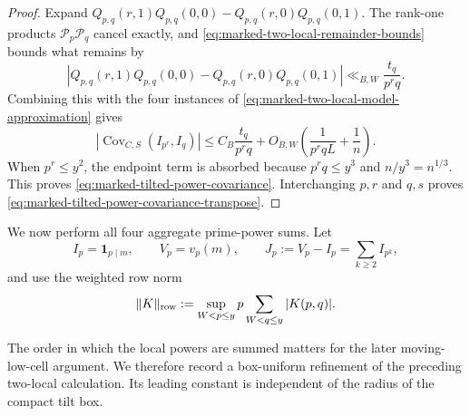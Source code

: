 \documentclass[11pt]{article}
\numberwithin{equation}{section}
\theoremstyle{definition}
\theoremstyle{remark}
\newcommand{\1}{\mathbf 1}
\begin{document}
\begin{proof}
Expand
\(
 Q_{p,q}(r,1)Q_{p,q}(0,0)
 -Q_{p,q}(r,0)Q_{p,q}(0,1)
\).
The rank-one products \(\mathcal P_p\mathcal P_q\) cancel exactly, and
\eqref{eq:marked-two-local-remainder-bounds} bounds what remains by
\begin{equation}
 \left|Q_{p,q}(r,1)Q_{p,q}(0,0)
 -Q_{p,q}(r,0)Q_{p,q}(0,1)\right|
 \ll_{B,W}\frac{t_q}{p^rq}.
 \label{eq:marked-two-local-model-covariance}
\end{equation}
Combining this with the four instances of
\eqref{eq:marked-two-local-model-approximation} gives
\[
 |\operatorname{Cov}_{C,S}(I_{p^r},I_q)|
 \le C_B\frac{t_q}{p^rq}
 +O_{B,W}\!\left(\frac1{p^rqL}+\frac1n\right).
\]
When \(p^r\le y^2\), the endpoint term is absorbed because
\(p^rq\le y^3\) and \(n/y^3=n^{1/3}\).  This proves
\eqref{eq:marked-tilted-power-covariance}.  Interchanging \(p,r\) and
\(q,s\) proves \eqref{eq:marked-tilted-power-covariance-transpose}.
\end{proof}

We now perform all four aggregate prime-power sums.  Let
\begin{equation}
 I_p=\1_{p\mid m},\qquad V_p=v_p(m),\qquad
 J_p:=V_p-I_p=\sum_{k\ge2}I_{p^k},
 \label{eq:marked-IJV-definitions}
\end{equation}
and use the weighted row norm
\begin{equation}
 \|K\|_{\rm row}:=\sup_{W<p\le y}
      p\sum_{W<q\le y}|K(p,q)|.
 \label{eq:marked-row-norm}
\end{equation}

The order in which the local powers are summed matters for the later
moving-low-cell argument.  We therefore record a box-uniform refinement
of the preceding two-local calculation.  Its leading constant is
independent of the radius of the compact tilt box.
\end{document}
